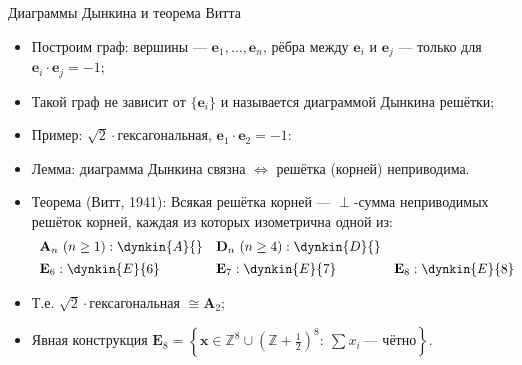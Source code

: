 \documentclass[serif, aspectratio=169]{beamer}
\begin{document}
\begin{frame}{Диаграммы Дынкина и теорема Витта}
    \begin{itemize}
        \item Построим граф: вершины --- $\mathbf{e}_1,\dots,\mathbf{e}_n$, рёбра между $\mathbf{e}_i$ и $\mathbf{e}_j$ --- только для $\mathbf{e}_i\cdot\mathbf{e}_j=-1$;
        \item Такой граф не зависит от $\{\mathbf{e}_i\}$ и называется диаграммой Дынкина решётки;
        \item Пример: $\sqrt2\cdot$гексагональная, $\mathbf{e}_1\cdot\mathbf{e}_2=-1$:\quad {}
        \item Лемма: диаграмма Дынкина связна $\Leftrightarrow$ решётка (корней) неприводима.
        \item Теорема (Витт, 1941): Всякая решётка корней --- $\perp$-сумма неприводимых решёток корней, каждая из которых изометрична одной из:
        \[
        \begin{array}{llll}
        \mathbf{A}_n\ (n\geq1): \dynkin{A}{} & \mathbf{D}_n\ (n\geq4): \dynkin{D}{} & & \\[1ex]
        \mathbf{E}_6: \dynkin{E}{6} & \mathbf{E}_7: \dynkin{E}{7} & \mathbf{E}_8: \dynkin{E}{8} &
        \end{array}
        \]
        \item Т.е. $\sqrt2\cdot$гексагональная $\cong \mathbf{A}_2$;
        \item Явная конструкция $\mathbf{E}_8 = \left\{\mathbf{x}\in\mathbb{Z}^8 \cup \left(\mathbb{Z}+\tfrac12\right)^8:\ \sum x_i\ \text{--- чётно}\right\}$.
    \end{itemize}
\end{frame}
\end{document}
